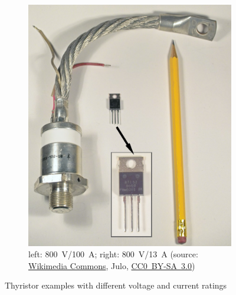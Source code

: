\begin{frame}[b]
\begin{figure}
\begin{subfigure}{0.45\textwidth}
            \includegraphics[height=0.45\textheight]{fig/lec05/Thyristor_example_02.jpg}
			\caption{left: \SI{800}{\volt}/\SI{100}{\ampere}; right: \SI{800}{\volt}/\SI{13}{\ampere} (source: \href{https://de.wikipedia.org/wiki/Datei:Thyristors_thyristoren.jpg}{Wikimedia Commons}, Julo, \href{https://creativecommons.org/licenses/by-sa/3.0/deed.de}{CC0~BY-SA~3.0})}
            \vspace{2em}
        \end{subfigure}
        \caption{Thyristor examples with different voltage and current ratings}
        \label{fig:thyristor_examples}
    \end{figure}
\end{frame}

